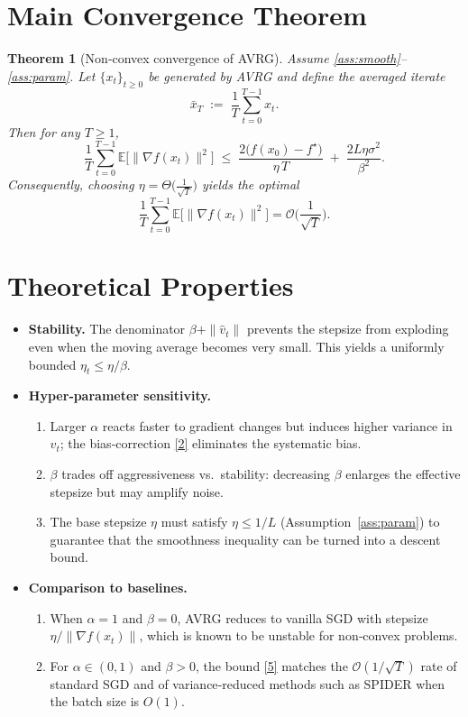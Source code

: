 \documentclass{article}
\newtheorem{theorem}{Theorem}
\newcommand{\EE}{\mathbb{E}}
\newcommand{\grad}{\nabla}
\begin{document}
\section*{Main Convergence Theorem}
\begin{theorem}[Non‑convex convergence of AVRG]\label{thm:main}
Assume \ref{ass:smooth}–\ref{ass:param}. Let $\{x_t\}_{t\ge0}$ be generated by AVRG and define the averaged iterate
\[
\bar x_T\;:=\;\frac1T\sum_{t=0}^{T-1}x_t .
\]
Then for any $T\ge1$,
\[
\frac1T\sum_{t=0}^{T-1}\EE\!\big[\|\grad f(x_t)\|^{2}\big]
\;\le\;
\frac{2\big(f(x_0)-f^{\star}\big)}{\eta\,T}
\;+\;
\frac{2L\eta\sigma^{2}}{\beta^{2}} .
\tag{5}
\]
Consequently, choosing $\eta=\Theta\!\big(\frac{1}{\sqrt{T}}\big)$ yields the optimal
\[
\frac1T\sum_{t=0}^{T-1}\EE\!\big[\|\grad f(x_t)\|^{2}\big]=\mathcal O\!\Big(\frac{1}{\sqrt{T}}\Big).
\]
\end{theorem}

\section*{Theoretical Properties}
\begin{itemize}[leftmargin=*]
\item \textbf{Stability.} The denominator $\beta+\|\hat v_t\|$ prevents the stepsize from exploding even when the moving average becomes very small. This yields a uniformly bounded $\eta_t\le \eta/\beta$.
\item \textbf{Hyper‑parameter sensitivity.}
   \begin{enumerate}
   \item Larger $\alpha$ reacts faster to gradient changes but induces higher variance in $v_t$; the bias‑correction \eqref{2} eliminates the systematic bias.
   \item $\beta$ trades off aggressiveness vs.\ stability: decreasing $\beta$ enlarges the effective stepsize but may amplify noise.
   \item The base stepsize $\eta$ must satisfy $\eta\le 1/L$ (Assumption~\ref{ass:param}) to guarantee that the smoothness inequality can be turned into a descent bound.
   \end{enumerate}
\item \textbf{Comparison to baselines.}
   \begin{enumerate}
   \item When $\alpha=1$ and $\beta=0$, AVRG reduces to vanilla SGD with stepsize $\eta/\|\grad f(x_t)\|$, which is known to be unstable for non‑convex problems.
   \item For $\alpha\in(0,1)$ and $\beta>0$, the bound \eqref{5} matches the $\mathcal O(1/\sqrt{T})$ rate of standard SGD and of variance‑reduced methods such as SPIDER when the batch size is $O(1)$.
   \end{enumerate}
\end{itemize}
\end{document}
